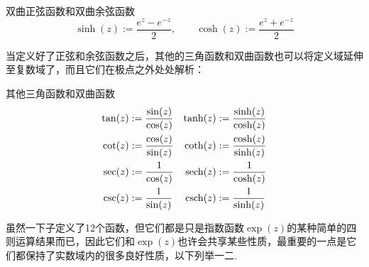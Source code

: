 \begin{definition}{双曲正弦函数和双曲余弦函数}
    \[\sinh(z) := \frac{e^z-e^{-z}}{2}, \qquad \cosh(z) := \frac{e^z+e^{-z}}{2}\]
\end{definition}

当定义好了正弦和余弦函数之后，其他的三角函数和双曲函数也可以将定义域延伸至复数域了，而且它们在极点之外处处解析：
\begin{definition}{其他三角函数和双曲函数}
    \[
    \begin{aligned}
        \tan(z) &:= \frac{\sin(z)}{\cos(z)} &  \tanh(z) &:= \frac{\sinh(z)}{\cosh(z)}\\
        \cot(z) &:= \frac{\cos(z)}{\sin(z)} & \coth(z) &:= \frac{\cosh(z)}{\sinh(z)} \\
        \sec(z) &:= \frac{1}{\cos(z)} & {\rm sech}(z) &:= \frac{1}{\cosh(z)} \\
        \csc(z) &:= \frac{1}{\sin(z)} & {\rm csch}(z) &:= \frac{1}{\sinh(z)}
    \end{aligned}
    \]  
\end{definition}

虽然一下子定义了12个函数，但它们都是只是指数函数\(\exp(z)\)的某种简单的四则运算结果而已，因此它们和\(\exp(z)\)也许会共享某些性质，最重要的一点是它们都保持了实数域内的很多良好性质，以下列举一二.

